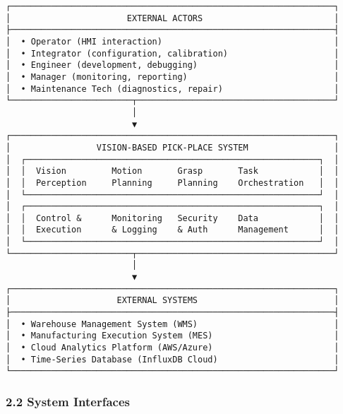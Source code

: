 \documentclass[
]{article}
\begin{document}
\begin{verbatim}
┌────────────────────────────────────────────────────────────────┐
│                       EXTERNAL ACTORS                          │
├────────────────────────────────────────────────────────────────┤
│  • Operator (HMI interaction)                                  │
│  • Integrator (configuration, calibration)                     │
│  • Engineer (development, debugging)                           │
│  • Manager (monitoring, reporting)                             │
│  • Maintenance Tech (diagnostics, repair)                      │
└────────────────────────┬───────────────────────────────────────┘
                         │
                         ▼
┌────────────────────────────────────────────────────────────────┐
│                 VISION-BASED PICK-PLACE SYSTEM                 │
│  ┌──────────────────────────────────────────────────────────┐  │
│  │  Vision         Motion       Grasp       Task            │  │
│  │  Perception     Planning     Planning    Orchestration   │  │
│  └──────────────────────────────────────────────────────────┘  │
│  ┌──────────────────────────────────────────────────────────┐  │
│  │  Control &      Monitoring   Security    Data            │  │
│  │  Execution      & Logging    & Auth      Management      │  │
│  └──────────────────────────────────────────────────────────┘  │
└────────────────────────┬───────────────────────────────────────┘
                         │
                         ▼
┌────────────────────────────────────────────────────────────────┐
│                     EXTERNAL SYSTEMS                           │
├────────────────────────────────────────────────────────────────┤
│  • Warehouse Management System (WMS)                           │
│  • Manufacturing Execution System (MES)                        │
│  • Cloud Analytics Platform (AWS/Azure)                        │
│  • Time-Series Database (InfluxDB Cloud)                       │
└────────────────────────────────────────────────────────────────┘
\end{verbatim}

\hypertarget{system-interfaces}{%
\subsubsection{2.2 System Interfaces}\label{system-interfaces}}
\end{document}
